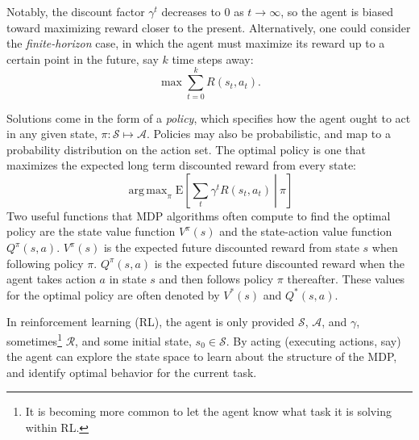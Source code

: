 \documentclass[11pt]{article}
\newcommand\davenote[1]{\textcolor{blue}{Dave: #1}}
\newcommand\jmnote[1]{\textcolor{red}{James: #1}}
\DeclareMathOperator*{\argmax}{arg\,max}
\begin{document}
Notably, the discount factor $\gamma^t$ decreases to $0$ as $t \rightarrow \infty$, so the agent is biased toward maximizing reward closer to the present. Alternatively, one could consider the {\it finite-horizon} case, in which the agent must maximize its reward up to a certain point in the future, say $k$ time steps away:
\begin{equation}
\max \sum_{t=0}^{k} R(s_t,a_t).
\end{equation}

Solutions come in the form of a {\it policy}, which specifies how the agent ought to act in any given state, $\pi : \mathcal{S} \mapsto \mathcal{A}$. Policies may also be probabilistic, and map to a probability distribution on the action set.
The optimal policy is one that maximizes the expected long term discounted reward from every state:
\begin{equation}
\argmax_\pi \left.\text{E}\left[\sum_t \gamma^t R(s_t,a_t)\ \right|\ \pi\right]
\end{equation}
Two useful functions that MDP algorithms often compute to find the optimal policy are the state value function $V^{\pi}(s)$ and the state-action value function $Q^{\pi}(s, a)$. $V^{\pi}(s)$ is the expected future discounted reward from state $s$ when following policy $\pi$. $Q^{\pi}(s, a)$ is the expected future discounted reward when the agent takes action $a$ in state $s$ and then follows policy $\pi$ thereafter. These values for the optimal policy are often denoted by $V^*(s)$ and $Q^*(s, a)$.


In reinforcement learning (RL), the agent is only provided $\mathcal{S}$, $\mathcal{A}$, and $\gamma$, sometimes\footnote{It is becoming more common to let the agent know what task it is solving within RL.} $\mathcal{R}$, and some initial state, $s_0 \in \mathcal{S}$. By acting (executing actions, say) the agent can explore the state space to learn about the structure of the MDP, and identify optimal behavior for the current task.

\end{document}
